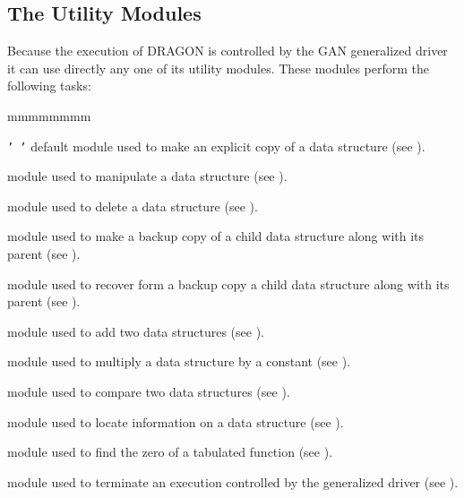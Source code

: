 \subsection{The Utility Modules}\label{sect:UtilityModules}

Because the execution of DRAGON is controlled by the GAN generalized driver it
can use directly any one of its utility modules. These modules perform the
following tasks:
 
\begin{ListeDeDescription}{mmmmmmmm}

\item[{\tt '~'}]  default module used to make an explicit copy of a data
structure (see ).

\item[\moc{UTL:}]  module used to manipulate a data structure (see
).

\item[\moc{DELETE:}] module used to delete a data structure (see
).

\item[\moc{BACKUP:}] module used to make a backup copy of a child data
structure along with its parent (see
).

\item[\moc{RECOVER:}] module used to recover form a backup copy a child data
structure along with its parent (see ).

\item[\moc{ADD:}] module used to add two data
structures (see ).

\item[\moc{MPX:}] module used to multiply a data
structure by a constant (see ).

\item[\moc{STAT:}] module used to compare two data
structures (see ).

\item[\moc{GREP:}] module used to locate information on a data
structure (see ).

\item[\moc{FIND0:}] module used to find the zero of a tabulated function (see
).

\item[\moc{END:}] module used to terminate an execution controlled by the
generalized driver (see ).

\end{ListeDeDescription}

